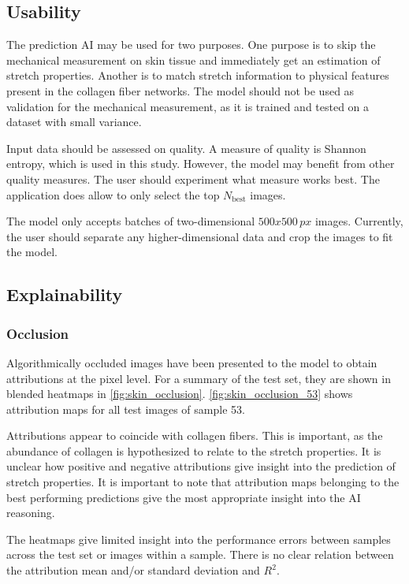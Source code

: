 \subsection{Usability}
The prediction AI may be used for two purposes.
One purpose is to skip the mechanical measurement on skin tissue and immediately get an estimation of stretch properties.
Another is to match stretch information to physical features present in the collagen fiber networks.
The model should not be used as validation for the mechanical measurement, as it is trained and tested on a dataset with small variance.

Input data should be assessed on quality.
A measure of quality is Shannon entropy, which is used in this study.
However, the model may benefit from other quality measures.
The user should experiment what measure works best.
The application does allow to only select the top $N_\mathrm{best}$ images.

The model only accepts batches of two-dimensional $500x500\,\unit{px}$ images.
Currently, the user should separate any higher-dimensional data and crop the images to fit the model.

\subsection{Explainability}

\subsubsection{Occlusion}
Algorithmically occluded images have been presented to the model to obtain attributions at the pixel level.
For a summary of the test set, they are shown in blended heatmaps in \cref{fig:skin_occlusion}.
\cref{fig:skin_occlusion_53} shows attribution maps for all test images of sample 53.

Attributions appear to coincide with collagen fibers.
This is important, as the abundance of collagen is hypothesized to relate to the stretch properties.
It is unclear how positive and negative attributions give insight into the prediction of stretch properties.
It is important to note that attribution maps belonging to the best performing predictions give the most appropriate insight into the AI reasoning.

The heatmaps give limited insight into the performance errors between samples across the test set or images within a sample.
There is no clear relation between the attribution mean and/or standard deviation and $R^2$.


